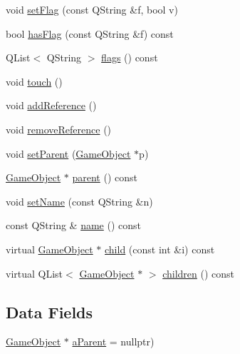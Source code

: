\begin{DoxyCompactItemize}
void \hyperlink{class_game_object_ae7984096fc518b15c0b080c543e4c42f}{set\-Flag} (const \-Q\-String \&f, bool v)
\item 
bool \hyperlink{class_game_object_a3c4f7121e75a8340a32e20f16b63b412}{has\-Flag} (const \-Q\-String \&f) const 
\item 
\-Q\-List$<$ \-Q\-String $>$ \hyperlink{class_game_object_aa9a0d6ea1bd41e4d4a370d2f010ac533}{flags} () const 
\item 
void \hyperlink{class_game_object_a2130d5674df041b5a7eaf987f9b1e642}{touch} ()
\item 
void \hyperlink{class_game_object_a815c7f587c0ae528614add95655d9a0a}{add\-Reference} ()
\item 
void \hyperlink{class_game_object_a68725fd75f55bc73bb44216406ce34e5}{remove\-Reference} ()
\item 
void \hyperlink{class_game_object_ae34944b23d5d7d472d5c8da3f42fb2e3}{set\-Parent} (\hyperlink{class_game_object}{\-Game\-Object} $\ast$p)
\item 
\hyperlink{class_game_object}{\-Game\-Object} $\ast$ \hyperlink{class_game_object_af3deaf39cde23c189765634e32e95bb4}{parent} () const 
\item 
void \hyperlink{class_game_object_ae928d2f18b5a26656ad41b7c27b463a7}{set\-Name} (const \-Q\-String \&n)
\item 
const \-Q\-String \& \hyperlink{class_game_object_aede5e0829a5fe107b1419bd62f03c132}{name} () const 
\item 
virtual \hyperlink{class_game_object}{\-Game\-Object} $\ast$ \hyperlink{class_game_object_a6ac392d25a490bee17b653a374ec94fc}{child} (const int \&i) const 
\item 
virtual \-Q\-List$<$ \hyperlink{class_game_object}{\-Game\-Object} $\ast$ $>$ \hyperlink{class_game_object_a3f68b64d3a0793048cfe5deab35397e0}{children} () const 
\end{DoxyCompactItemize}
\subsection*{\-Data \-Fields}
\begin{DoxyCompactItemize}
\item 
\hyperlink{class_game_object}{\-Game\-Object} $\ast$ \hyperlink{class_game_object_a41d4afe43f955e78ede0bbd4ad8957f8}{a\-Parent} = nullptr)
\end{DoxyCompactItemize}
